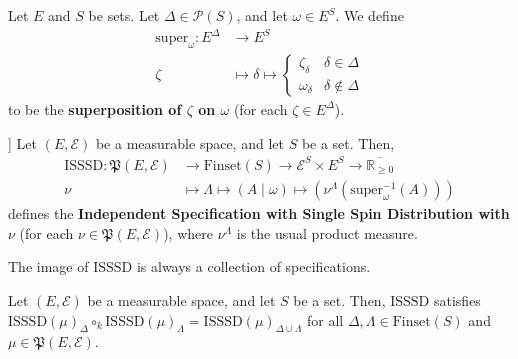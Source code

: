 
\begin{definition}[Superposition]
    \label{def:superposition}
    \leanok
    Let $E$ and $S$ be sets. Let $\Delta\in\mathcal{P}(S)$, and let $\omega\in E^S$. We define
    \begin{align*}
        \text{super}_\omega:E^\Delta&\to E^S\\
        \zeta&\mapsto \delta\mapsto\begin{cases}
            \zeta_\delta & \delta\in\Delta\\
            \omega_\delta & \delta\notin\Delta
        \end{cases}
    \end{align*}
    to be the \textbf{superposition of $\zeta$ on $\omega$} (for each $\zeta\in E^\Delta$).
\end{definition}

\begin{definition}[Independent Specification with Single Spin Distribution [ISSSD]]
    \label{def:ISSSD}
    Let $(E,\mathcal{E})$ be a measurable space, and let $S$ be a set. Then,
    \begin{align*}
        \text{ISSSD}:\mathfrak{P}(E,\mathcal{E})&\to\text{Finset}(S)\to\mathcal{E}^S\times E^S\to\overline{\mathbb{R}_{\geq0}}\\
        \nu&\mapsto\Lambda\mapsto(A\mid\omega)\mapsto\left(\nu^\Lambda\left(\text{super}_\omega^{-1}(A)\right)\right)
    \end{align*}
    defines the \textbf{Independent Specification with Single Spin Distribution with $\nu$} (for each $\nu\in\mathfrak{P}(E,\mathcal{E})$), where $\nu^\Lambda$ is the usual product measure.
\end{definition}

\begin{lemma}
    \label{lem:ISSSDs_are_specifications}
    The image of $\text{ISSSD}$ is always a collection of specifications.
\end{lemma}

\begin{lemma}
    \label{lem:strong_consistency_of_ISSSDs}
    Let $(E,\mathcal{E})$ be a measurable space, and let $S$ be a set. Then, $\text{ISSSD}$ satisfies $\text{ISSSD}(\mu)_\Delta\circ_k\text{ISSSD}(\mu)_\Lambda=\text{ISSSD}(\mu)_{\Delta\cup\Lambda}$ for all $\Delta,\Lambda\in\text{Finset}(S)$ and $\mu\in\mathfrak{P}(E,\mathcal{E})$.
\end{lemma}

